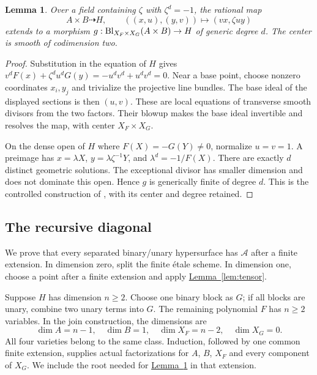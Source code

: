 \documentclass[11pt,a4paper]{article}
\newtheorem{lemma}[theorem]{Lemma}
\theoremstyle{definition}
\theoremstyle{remark}\newtheorem{remark}[theorem]{Remark}
\numberwithin{equation}{section}
\newcommand{\lemref}[1]{\hyperref[#1]{\textcolor{resultlink}{Lemma~\ref*{#1}}}}
\begin{document}
\begin{lemma}\label{lem:join}
Over a field containing $\zeta$ with $\zeta^d=-1$, the rational map
\begin{equation}\label{eq:join-map}
 A\times B\dashrightarrow H,\qquad
 ((x,u),(y,v))\longmapsto(vx,\zeta uy)
\end{equation}
extends to a morphism
$g:\operatorname{Bl}_{X_F\times X_G}(A\times B)\to H$ of generic degree $d$.
The center is smooth of codimension two.
\end{lemma}

\begin{proof}
Substitution in the equation of $H$ gives
$v^dF(x)+\zeta^du^dG(y)=-u^dv^d+u^dv^d=0$.
Near a base point, choose nonzero coordinates $x_i,y_j$ and
trivialize the projective line bundles. The base ideal of the
displayed sections is then $(u,v)$. These are local equations
of transverse smooth divisors from the two factors. Their blowup
makes the base ideal invertible and resolves the map, with center
$X_F\times X_G$.

On the dense open of $H$ where $F(X)=-G(Y)\ne0$, normalize
$u=v=1$. A preimage has
$x=\lambda X$, $y=\lambda\zeta^{-1}Y$, and
$\lambda^d=-1/F(X)$. There are exactly $d$ distinct geometric
solutions. The exceptional divisor has smaller dimension and
does not dominate this open. Hence $g$ is generically finite
of degree $d$. This is the controlled construction of
\cite[Remark 1.10]{SK}, with its center and degree retained.
\end{proof}

\subsection{The recursive diagonal}\label{proof:binary}

We prove that every separated binary/unary hypersurface has
$\mathcal A$ after a finite extension. In dimension zero, split
the finite \'etale scheme. In dimension one, choose a
point after a finite extension and apply \lemref{lem:tensor}.

Suppose $H$ has dimension $n\ge2$. Choose one binary block as
$G$; if all blocks are unary, combine two unary terms into $G$.
The remaining polynomial $F$ has $n\ge2$ variables. In the
join construction, the dimensions are
\[
 \dim A=n-1,\quad \dim B=1,\quad
 \dim X_F=n-2,\quad \dim X_G=0.
\]
All four varieties belong to the same class. Induction, followed
by one common finite extension, supplies actual factorizations
for $A$, $B$, $X_F$ and every component of $X_G$. We include
the root needed for \lemref{lem:join} in that extension.
\end{document}
